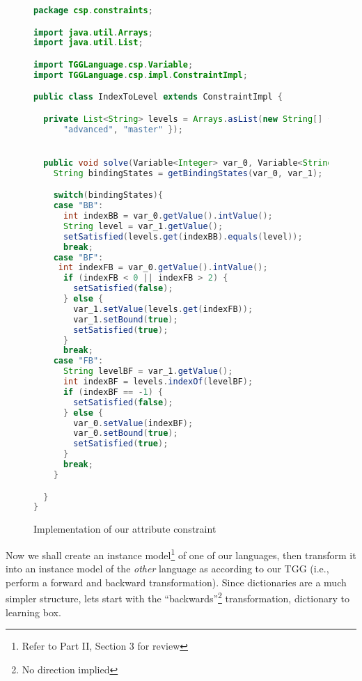 \begin{figure}[htbp]
\begin{center}
\begin{lstlisting}[language=Java,backgroundcolor=\color{white}, keywordstyle={\bfseries\color{purple}}]
package csp.constraints;

import java.util.Arrays;
import java.util.List;

import TGGLanguage.csp.Variable;
import TGGLanguage.csp.impl.ConstraintImpl;

public class IndexToLevel extends ConstraintImpl {

  private List<String> levels = Arrays.asList(new String[] { "beginner",
      "advanced", "master" });


  public void solve(Variable<Integer> var_0, Variable<String> var_1){
    String bindingStates = getBindingStates(var_0, var_1);

    switch(bindingStates){
    case "BB":
      int indexBB = var_0.getValue().intValue();
      String level = var_1.getValue();
      setSatisfied(levels.get(indexBB).equals(level));
      break;
    case "BF":
     int indexFB = var_0.getValue().intValue();
      if (indexFB < 0 || indexFB > 2) {
        setSatisfied(false);
      } else {
        var_1.setValue(levels.get(indexFB));
        var_1.setBound(true);
        setSatisfied(true);
      }
      break;
    case "FB":
      String levelBF = var_1.getValue();
      int indexBF = levels.indexOf(levelBF);
      if (indexBF == -1) {
        setSatisfied(false);
      } else {
        var_0.setValue(indexBF);
        var_0.setBound(true);
        setSatisfied(true);
      }
      break;
    }

  }
}
\end{lstlisting}
  \caption{Implementation of our attribute constraint}
  \label{fig:indexToLevel}
\end{center}
\end{figure}

\clearpage

Now we shall create an instance model\footnote{Refer to Part II, Section 3 for review} of one of our languages, then transform it into an instance model of the
\emph{other} language as according to our TGG (i.e., perform a forward and backward transformation). Since dictionaries are a much simpler structure, lets start
with the ``backwards''\footnote{No direction implied} transformation, dictionary to learning box.

